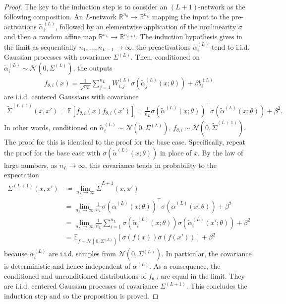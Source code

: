 \documentclass[10pt]{article}
\newcommand{\RR}{\mathbb{R}}
\newcommand{\EE}{\mathbb{E}}
\newcommand{\NN}{\mathcal{N}}
\newcommand{\paran}[1]{{( #1 )}}
\begin{document}
\begin{proof}
The key to the induction step is to consider an $(L + 1)$-network as the following composition. An $L$-network $\RR^{n_0} \rightarrow \RR^{n_L}$ mapping the input to the pre-activations $\tilde{\alpha}^\paran{L}_i$, followed by an elementwise application of the nonlinearity $\sigma$ and then a random affine map $\RR^{n_L} \rightarrow \RR^{n_{L + 1}}$. The induction hypothesis gives in the limit as sequentially $n_1, \ldots, n_{L - 1} \rightarrow \infty$, the preactivations $\tilde{\alpha}^\paran{L}_i$ tend to i.i.d. Gaussian processes with covariance $\Sigma^\paran{L}$. Then, conditioned on $\tilde{\alpha}^\paran{L}_i \sim \NN(0,\Sigma^\paran{L})$, the outputs
\begin{align*}
f_{\theta,i}(x) = \frac{1}{\sqrt{n_L}} \sum_{j = 1}^{n_L} W^\paran{L}_{i,j} \sigma(\tilde{\alpha}^\paran{L}_j(x;\theta)) + \beta b^\paran{L}_i
\end{align*}
are i.i.d. centered Gaussians with covariance
\begin{align*}
\tilde{\Sigma}^\paran{L + 1}(x,x') = \EE[f_{\theta,i}(x) f_{\theta,i}(x')] = \frac{1}{n_L} \sigma(\tilde{\alpha}^\paran{L}(x;\theta))^\top \sigma(\tilde{\alpha}^\paran{L}(x;\theta)) + \beta^2.
\end{align*}
In other words, conditioned on $\tilde{\alpha}^\paran{L}_i \sim \NN(0,\Sigma^\paran{L})$, $f_{\theta,i} \sim \NN(0,\tilde{\Sigma}^\paran{L + 1})$. The proof for this is identical to the proof for the base case. Specifically, repeat the proof for the base case with $\sigma(\tilde{\alpha}^\paran{L}(x;\theta))$ in place of $x$. By the law of large numbers, as $n_L \rightarrow \infty$, this covariance tends in probability to the expectation
\begin{align*}
\Sigma^\paran{L + 1}(x,x') &\coloneqq \lim_{n_L \rightarrow \infty} \tilde{\Sigma}^{L + 1}(x,x') \\
&= \lim_{n_L \rightarrow \infty} \frac{1}{n_L} \sigma(\tilde{\alpha}^\paran{L}(x;\theta))^\top \sigma(\tilde{\alpha}^\paran{L}(x;\theta)) + \beta^2 \\
&= \lim_{n_L \rightarrow \infty} \frac{1}{n_L} \sum_{i = 1}^{n_L} \sigma(\tilde{\alpha}^\paran{L}_i(x;\theta)) \sigma(\tilde{\alpha}^\paran{L}_i(x';\theta)) + \beta^2 \\
&= \EE_{f \sim \NN(0,\Sigma^\paran{L})}[\sigma(f(x))\sigma(f(x'))] + \beta^2
\end{align*}
because $\tilde{\alpha}^\paran{L}_i$ are i.i.d. samples from $\NN(0,\Sigma^\paran{L})$. In particular, the covariance is deterministic and hence independent of $\alpha^\paran{L}$. As a consequence, the conditioned and unconditioned distributions of $f_{\theta,i}$ are equal in the limit. They are i.i.d. centered Gaussian processes of covariance $\Sigma^\paran{L + 1}$. This concludes the induction step and so the proposition is proved.
\end{proof}
\end{document}
